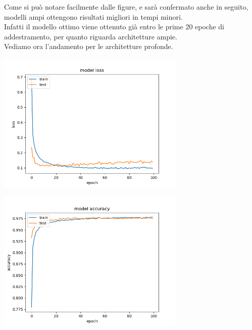 \documentclass[12pt]{article}
\begin{document}
Come si può notare facilmente dalle figure, e sarà confermato anche in seguito,
modelli ampi ottengono risultati migliori in tempi minori.\\
Infatti il modello ottimo viene ottenuto già entro le prime 20 epoche
di addestramento, per quanto riguarda architetture ampie.\\

Vediamo ora l'andamento per le architetture profonde.

\begin{multicols}{2}
    \noindent
    \begin{minipage}{\linewidth}
        \centering
        \includegraphics[width=9cm]{../mnist_models/MLPNN_type1-batch128-balanced/0test_loss_acc.png}
        \label{fig:cc}
    \end{minipage}
    \bigskip

    \noindent
    \begin{minipage}{\linewidth}
        \centering
        \includegraphics[width=9cm]{../mnist_models/MLPNN_type1-batch128-balanced/0train_loss_acc.png}
        \label{fig:cc}
    \end{minipage}
    \bigskip
\end{multicols}
\end{document}
